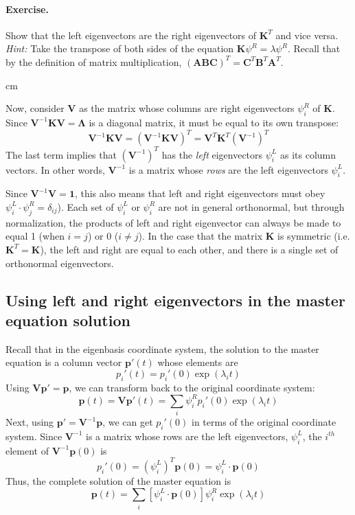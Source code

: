 \documentclass[11pt, oneside]{article}   	%
\begin{document}
\paragraph{Exercise.}  Show that the left eigenvectors are the right eigenvectors of $\mathbf{K}^T$ and vice versa.  \textit{Hint:} Take the transpose of both sides of the equation $\mathbf{K} \psi^R = \lambda \psi^R$.  Recall that by the definition of matrix multiplication,  $(\mathbf{ABC})^T = \mathbf{C}^T\mathbf{B}^T\mathbf{A}^T.$ 

 cm

Now, consider $\mathbf{V}$ as the matrix whose columns are right eigenvectors $\psi^R_i$ of $\mathbf{K}$.  Since $\mathbf{V}^{-1}\mathbf{KV} = \mathbf{\Lambda}$ is a diagonal matrix, it must be equal to its own transpose:
\[
\mathbf{V}^{-1}\mathbf{KV} = (\mathbf{V}^{-1}\mathbf{KV})^T = \mathbf{V}^T\mathbf{K}^T (\mathbf{V}^{-1})^T
\]
The last term implies that $(\mathbf{V}^{-1})^T$  has the \textit{left} eigenvectors $\psi_i^L$ as its column vectors.  In other words, $\mathbf{V}^{-1}$ is a matrix whose \textit{rows} are the left eigenvectors $\psi_i^L$.   

Since $\mathbf{V}^{-1} \mathbf{V} = \mathbf{1}$, this also means that left and right eigenvectors must obey $\psi_i^L \cdot \psi_j^R = \delta_{ij}$).  Each set of $\psi_i^L$ or $\psi_i^R$ are not in general orthonormal, but through normalization, the products of left and right eigenvector can always be made to equal 1 (when $i=j$) or 0 ($i \neq j$). In the case that the matrix $\mathbf{K}$ is symmetric (i.e. $\mathbf{K}^T = \mathbf{K}$), the left and right are equal to each other, and there is a single set of orthonormal eigenvectors.

\subsection*{Using left and right eigenvectors in the master equation solution}

Recall that in the eigenbasis coordinate system, the solution to the master equation is a column vector $\mathbf{p}'(t)$ whose elements are
\[
p_i'(t) = p_i'(0) \exp (\lambda_i t)
\]
Using $\mathbf{Vp}' = \mathbf{p}$, we can transform back to the original coordinate system:
\[
\mathbf{p}(t) = \mathbf{Vp}'(t) = \sum_i \psi_i^R p_i'(0) \exp (\lambda_i t)
\]
Next, using $\mathbf{p}' = \mathbf{V}^{-1}\mathbf{p}$, we can get $p_i'(0)$ in terms of the original coordinate system.   Since $\mathbf{V}^{-1}$ is a matrix whose rows are the left eigenvectors, $\psi^L_i$, the $i^{th}$ element of $\mathbf{V}^{-1}\mathbf{p}(0)$ is
\[
p_i'(0) = (\psi^L_i)^T\mathbf{p}(0) =  \psi^L_i \cdot \mathbf{p}(0) 
\]
Thus, the complete solution of the master equation is
\[
\mathbf{p}(t) = \sum_i [ \psi^L_i \cdot \mathbf{p}(0)  ] \psi_i^R \exp (\lambda_i t)
\]
\end{document}
